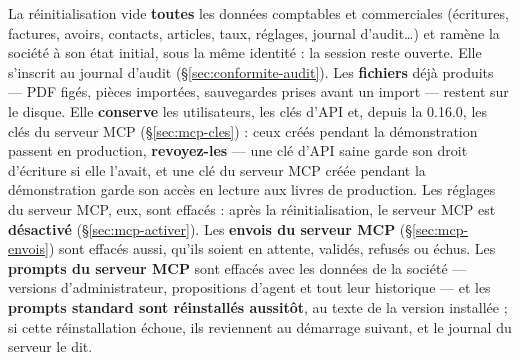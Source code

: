 \documentclass[a4paper,11pt,oneside]{article}
\begin{document}
\begin{enumerate}
    La réinitialisation vide \textbf{toutes} les données comptables et commerciales (écritures, factures, avoirs, contacts, articles, taux, réglages, journal d'audit…) et ramène la société à son état initial, sous la même identité : la session reste ouverte. Elle s'inscrit au journal d'audit (\S\ref{sec:conformite-audit}). Les \textbf{fichiers} déjà produits --- PDF figés, pièces importées, sauvegardes prises avant un import --- restent sur le disque. Elle \textbf{conserve} les utilisateurs, les clés d'API et, depuis la 0.16.0, les clés du serveur MCP (\S\ref{sec:mcp-cles}) : ceux créés pendant la démonstration passent en production, \textbf{revoyez-les} --- une clé d'API saine garde son droit d'écriture si elle l'avait, et une clé du serveur MCP créée pendant la démonstration garde son accès en lecture aux livres de production. Les réglages du serveur MCP, eux, sont effacés : après la réinitialisation, le serveur MCP est \textbf{désactivé} (\S\ref{sec:mcp-activer}). Les \textbf{envois du serveur MCP} (\S\ref{sec:mcp-envois}) sont effacés aussi, qu'ils soient en attente, validés, refusés ou échus. Les \textbf{prompts du serveur MCP} sont effacés avec les données de la société --- versions d'administrateur, propositions d'agent et tout leur historique --- et les \textbf{prompts standard sont réinstallés aussitôt}, au texte de la version installée ; si cette réinstallation échoue, ils reviennent au démarrage suivant, et le journal du serveur le dit.


\end{enumerate}
\end{document}
